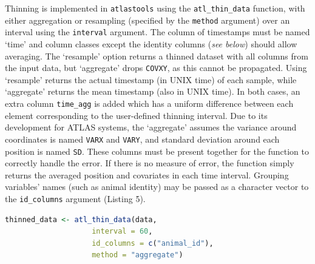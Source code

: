 \documentclass[10pt,paper=a4,headings=standardclasses
]{scrartcl}
\begin{document}
Thinning is implemented in \texttt{atlastools} using the \texttt{atl\_thin\_data} function, with either aggregation or resampling (specified by the \texttt{method} argument) over an interval using the \texttt{interval} argument.
The column of timestamps must be named `time' and column classes except the identity columns (\textit{see below}) should allow averaging.
The `resample' option returns a thinned dataset with all columns from the input data, but `aggregate' drops \texttt{COVXY}, as this cannot be propagated.
Using `resample' returns the actual timestamp (in UNIX time) of each sample, while `aggregate' returns the mean timestamp (also in UNIX time).
In both cases, an extra column \texttt{time\_agg} is added which has a uniform difference between each element corresponding to the user-defined thinning interval.
Due to its development for ATLAS systems, the `aggregate' assumes the variance around coordinates is named \texttt{VARX} and \texttt{VARY}, and standard deviation around each position is named \texttt{SD}.
These columns must be present together for the function to correctly handle the error.
If there is no measure of error, the function simply returns the averaged position and covariates in each time interval.
Grouping variables' names (such as animal identity) may be passed as a character vector to the \texttt{id\_columns} argument (Listing 5).

\begin{lstlisting}[float, language=R, style=customR, caption = {Code to thin data by aggregation in \texttt{atlastools}. The method can be either "aggregate" or "resample". 
The time interval is specified in seconds, while the \texttt{id\_columns} allows a character vector of column names to be passed to the function, with these columns used as identity variables.
Both methods return a dataset with as many rows as there are time-intervals.
While the resampling method retains all columns, the aggregation method drops the ATLAS specific columns specifying covariance in X and Y coordinates (COVXY), and location error (SD).}]
thinned_data <- atl_thin_data(data,
                    interval = 60,
                    id_columns = c("animal_id"),
                    method = "aggregate")
\end{lstlisting}
\end{document}
